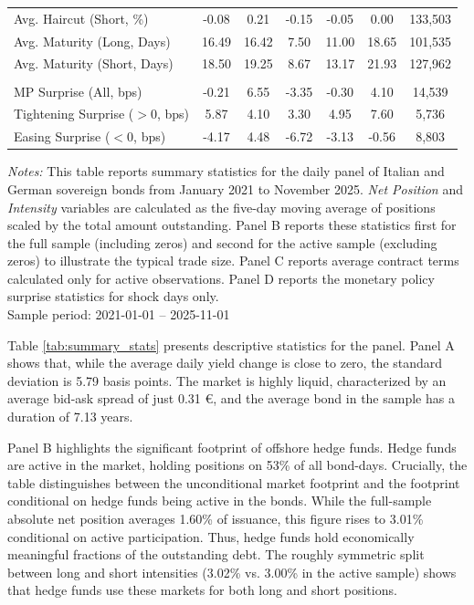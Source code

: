 \documentclass[english, 11pt, oneside]{article}
\begin{document}
\begin{table}[t]
\begin{tabular}{lcccccc}
Avg. Haircut (Short, \%) & -0.08 & 0.21 & -0.15 & -0.05 & 0.00 & 133,503 \\
Avg. Maturity (Long, Days) & 16.49 & 16.42 & 7.50 & 11.00 & 18.65 & 101,535 \\
Avg. Maturity (Short, Days) & 18.50 & 19.25 & 8.67 & 13.17 & 21.93 & 127,962 \\
\addlinespace
\multicolumn{7}{l}{\textit{Panel D: Monetary Policy Shocks (Shock days only)}} \\
MP Surprise (All, bps) & -0.21 & 6.55 & -3.35 & -0.30 & 4.10 & 14,539 \\
Tightening Surprise ($>0$, bps) & 5.87 & 4.10 & 3.30 & 4.95 & 7.60 & 5,736 \\
Easing Surprise ($<0$, bps) & -4.17 & 4.48 & -6.72 & -3.13 & -0.56 & 8,803 \\
\bottomrule
\end{tabular}

\vspace{1ex}
\raggedright\scriptsize
\textit{Notes:} This table reports summary statistics for the daily panel of Italian and German sovereign bonds from January 2021 to November 2025. \textit{Net Position} and \textit{Intensity} variables are calculated as the five-day moving average of positions scaled by the total amount outstanding. Panel B reports these statistics first for the full sample (including zeros) and second for the active sample (excluding zeros) to illustrate the typical trade size. Panel C reports average contract terms calculated only for active observations. Panel D reports the monetary policy surprise statistics for shock days only. \\ Sample period: 2021-01-01 -- 2025-11-01
\end{table}


Table \ref{tab:summary_stats} presents descriptive statistics for the panel. Panel A shows that, while the average daily yield change is close to zero, the standard deviation is 5.79 basis points. The market is highly liquid, characterized by an average bid-ask spread of just 0.31 \euro, and the average bond in the sample has a duration of 7.13 years.

Panel B highlights the significant footprint of offshore hedge funds. Hedge funds are active in the market, holding positions on 53\% of all bond-days. Crucially, the table distinguishes between the unconditional market footprint and the footprint conditional on hedge funds being active in the bonds. While the full-sample absolute net position averages 1.60\% of issuance, this figure rises to 3.01\% conditional on active participation. Thus, hedge funds hold economically meaningful fractions of the outstanding debt. The roughly symmetric split between long and short intensities (3.02\% vs. 3.00\% in the active sample) shows that hedge funds use these markets for both long and short positions.
\end{document}
